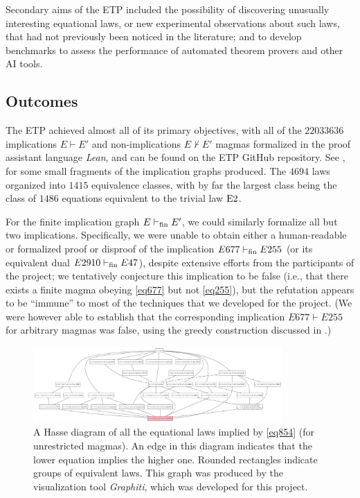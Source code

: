 Secondary aims of the ETP included the possibility of discovering unusually interesting equational laws, or new experimental observations about such laws, that had not previously been noticed in the literature; and to develop benchmarks to assess the performance of automated theorem provers and other AI tools.

\subsection{Outcomes}

The ETP achieved almost all of its primary objectives, with all of the $\num{22033636}$ implications $E \vdash E'$ and non-implications $E \not \vdash E'$ magmas formalized in the proof assistant language \emph{Lean}, and can be found on the ETP GitHub repository.  See ,  for some small fragments of the implication graphs produced.
The $\num{4694}$ laws organized into $\num{1415}$ equivalence classes, with by far the largest class being the class of $\num{1486}$ equations equivalent to the trivial law $\mathrm{E}2$.

For the finite implication graph $E \vdash_{\mathrm{fin}} E'$, we could similarly formalize all but two implications.  Specifically, we were unable to obtain either a human-readable or formalized proof or disproof of the implication $E677 \vdash_{\mathrm{fin}} E255$ (or its equivalent dual $E2910 \vdash_{\mathrm{fin}} E47$), despite extensive efforts from the participants of the project; we tentatively conjecture this implication to be false (i.e., that there exists a finite magma obeying \eqref{eq677} but not \eqref{eq255}), but the refutation appears to be ``immune'' to most of the techniques that we developed for the project.  (We were however able to establish that the corresponding implication $E677 \vdash E255$ for arbitrary magmas was false, using the greedy construction discussed in .)

\begin{figure}
\centering
\includegraphics[width=0.85\textwidth]{854.png}
\caption{A Hasse diagram of all the equational laws implied by \eqref{eq854} (for unrestricted magmas).  An edge in this diagram indicates that the lower equation implies the higher one. Rounded rectangles indicate groups of equivalent laws.  This graph was produced by the visualization tool \emph{Graphiti}, which was developed for this project.}
\label{fig:854}
\end{figure}


